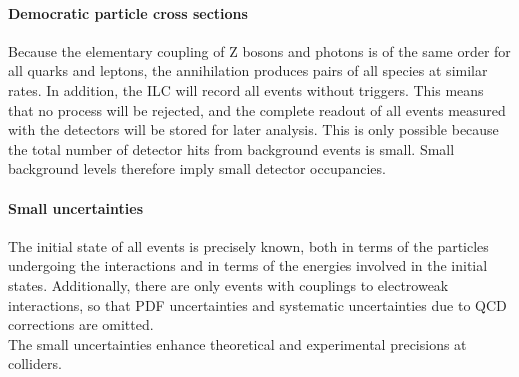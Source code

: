 \paragraph{Democratic particle cross sections}
Because the elementary coupling of Z bosons and photons is of the same order for all quarks and leptons, the \positron\electron annihilation produces pairs of all species at similar rates.
In addition, the ILC will record all events without triggers.
This means that no process will be rejected, and the complete readout of all events measured with the detectors will be stored for later analysis.
This is only possible because the total number of detector hits from background events is small.
Small background levels therefore imply small detector occupancies.

\paragraph{Small uncertainties}
The initial state of all events is precisely known, both in terms of the particles undergoing the interactions and in terms of the energies involved in the initial states.
Additionally, there are only events with couplings to electroweak interactions, so that PDF uncertainties and systematic uncertainties due to QCD corrections are omitted.
\\The small uncertainties enhance theoretical and experimental precisions at \positron\electron colliders.

